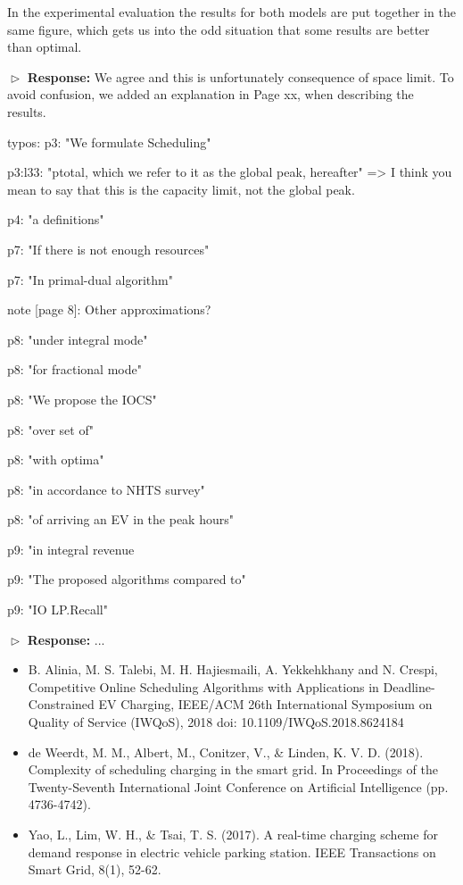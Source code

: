 \documentclass[11pt]{article}
\begin{document}
\vspace{3mm}
{\color{blue} In the experimental evaluation the results for both models are put together in the same figure, which gets us into the odd situation that some results are better than optimal.
 }
\vspace{3mm}

$\vartriangleright$ \noindent\textbf{Response:} 
We agree and this is unfortunately consequence of space limit. To avoid confusion, we added an explanation in Page xx, when describing the results. 

\vspace{3mm}
{\color{blue} typos:
p3: "We formulate Scheduling"

p3:l33: "ptotal, which we refer to it as the global peak, hereafter" => I think you mean to say that this is the capacity limit, not the global peak.

p4: "a definitions"

p7: "If there is not enough resources"

p7: "In primal-dual algorithm"

note [page 8]: Other approximations?

p8: "under integral mode"

p8: "for fractional mode"

p8: "We propose the IOCS"

p8: "over set of"

p8: "with optima"

p8: "in accordance to NHTS survey"

p8: "of arriving an EV in the peak hours"

p9: "in integral revenue

p9: "The proposed algorithms compared to"

p9: "IO LP.Recall"
 }
\vspace{3mm}

$\vartriangleright$ \noindent\textbf{Response:} 
...


\begin{itemize}
\item B. Alinia, M. S. Talebi, M. H. Hajiesmaili, A. Yekkehkhany and N. Crespi, Competitive Online Scheduling Algorithms with Applications in Deadline-Constrained EV Charging, IEEE/ACM 26th International Symposium on Quality of Service (IWQoS), 2018
doi: 10.1109/IWQoS.2018.8624184

\item de Weerdt, M. M., Albert, M., Conitzer, V., \& Linden, K. V. D. (2018). Complexity of scheduling charging in the smart grid. In Proceedings of the Twenty-Seventh International Joint Conference on Artificial Intelligence (pp. 4736-4742).

\item Yao, L., Lim, W. H., \& Tsai, T. S. (2017). A real-time charging scheme for demand response in electric vehicle parking station. IEEE Transactions on Smart Grid, 8(1), 52-62.
\end{itemize}
\end{document}
